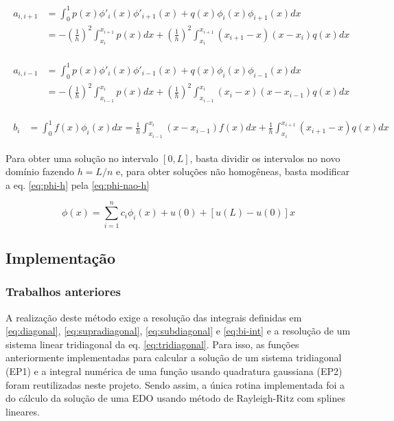 \documentclass[a4,12pt]{horizon-theme}
\begin{document}
\begin{align}\label{eq:supradiagonal}
  \begin{split}
    a_{i,i+1} & = \int_0^1 {p(x)\phi'_i(x)\phi'_{i+1}(x) + q(x)\phi_i(x)\phi_{i+1}(x)}dx\\
    {} & = -\left(\frac{1}{h}\right)^2 \int_{x_i}^{x_{i+1}} p(x)dx + \left(\frac{1}{h}\right)^2 \int_{x_i}^{x_{i+1}} (x_{i+1} - x)(x - x_i)q(x)dx
  \end{split}
\end{align}

\begin{align}\label{eq:subdiagonal}
  \begin{split}
    a_{i,i-1} & = \int_0^1 {p(x)\phi'_i(x)\phi'_{i-1}(x) + q(x)\phi_i(x)\phi_{i-1}(x)}dx\\
    {} & = -\left(\frac{1}{h}\right)^2 \int_{x_{i-1}}^{x_i} p(x)dx + \left(\frac{1}{h}\right)^2 \int_{x_{i-1}}^{x_i} (x_i - x)(x - x_{i-1})q(x)dx
  \end{split}
\end{align}

\begin{align}\label{eq:bi-int}
  \begin{split}
    b_i & = \int_0^1 f(x)\phi_i(x)dx = \frac{1}{h} \int_{x_{i-1}}^{x_i} (x - x_{i-1})f(x)dx + \frac{1}{h} \int_{x_i}^{x_{i+1}} (x_{i+1} - x)q(x)dx
  \end{split}
\end{align}

Para obter uma solução no intervalo $[0, L]$, basta dividir os intervalos no novo domínio fazendo $h = L/n$ e, para obter soluções não homogêneas, basta modificar a eq. \eqref{eq:phi-h} pela \eqref{eq:phi-nao-h}

\begin{equation}\label{eq:phi-nao-h}
  \phi(x) = \sum_{i=1}^n c_i\phi_i(x) + u(0) + [u(L) - u(0)]x
\end{equation}


\subsection{Implementação}
\label{sec:implementacao}

\subsubsection{Trabalhos anteriores}
A realização deste método exige a resolução das integrais definidas em \eqref{eq:diagonal}, \eqref{eq:supradiagonal}, \eqref{eq:subdiagonal}  e \eqref{eq:bi-int} e a resolução de um sistema linear tridiagonal da eq. \eqref{eq:tridiagonal}. Para isso, as funções anteriormente implementadas para calcular a solução de um sistema tridiagonal (EP1) e a integral numérica de uma função usando quadratura gaussiana (EP2) foram reutilizadas neste projeto. Sendo assim, a única rotina implementada foi a do cálculo da solução de uma EDO usando método de Rayleigh-Ritz com splines lineares.
\end{document}
